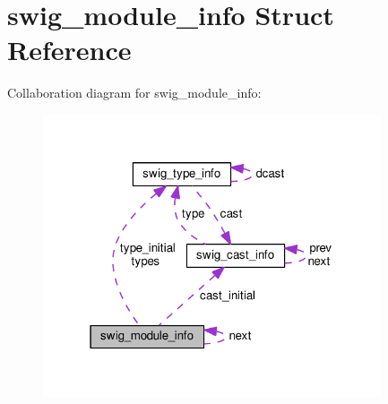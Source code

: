 \hypertarget{structswig__module__info}{}\section{swig\+\_\+module\+\_\+info Struct Reference}
\label{structswig__module__info}


Collaboration diagram for swig\+\_\+module\+\_\+info\+:
\nopagebreak
\begin{figure}[H]
\begin{center}
\leavevmode
\includegraphics[width=283pt]{structswig__module__info__coll__graph}
\end{center}
\end{figure}
